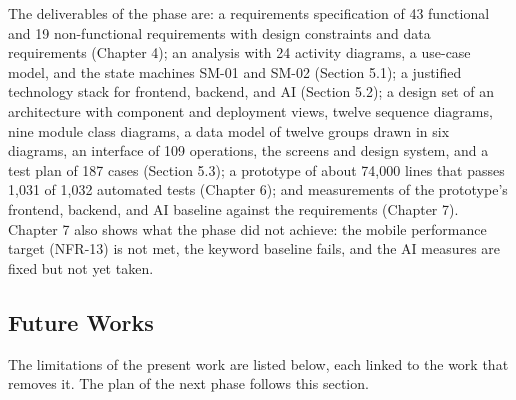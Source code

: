 The deliverables of the phase are: a requirements specification of 43 functional and 19 non-\allowbreak{}functional requirements with design constraints and data requirements (Chapter 4); an analysis with 24 activity diagrams, a use-case model, and the state machines SM-01 and SM-02 (Section 5.1); a justified technology stack for frontend, backend, and AI (Section 5.2); a design set of an architecture with component and deployment views, twelve sequence diagrams, nine module class diagrams, a data model of twelve groups drawn in six diagrams, an interface of 109 operations, the screens and design system, and a test plan of 187 cases (Section 5.3); a prototype of about 74,000 lines that passes 1,031 of 1,032 automated tests (Chapter 6); and measurements of the prototype's frontend, backend, and AI baseline against the requirements (Chapter 7). Chapter 7 also shows what the phase did not achieve: the mobile performance target (NFR-13) is not met, the keyword baseline fails, and the AI measures are fixed but not yet taken.

\subsection{Future Works}

The limitations of the present work are listed below, each linked to the work that removes it. The plan of the next phase follows this section.

